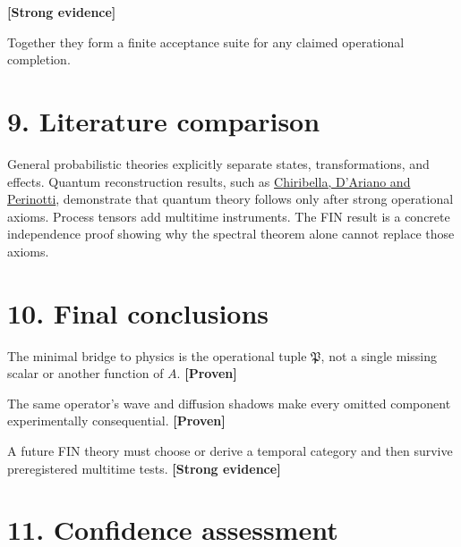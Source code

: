 \documentclass[11pt,a4paper,openany]{report}
\newcommand{\statusProven}{\textcolor{fingreen}{[Proven]}}
\newcommand{\statusStrong}{\textcolor{finblue}{[Strong evidence]}}
\begin{document}
\textbf{\statusStrong{}}

Together they form a finite acceptance suite for any claimed operational completion.

\section{9. Literature comparison}

General probabilistic theories explicitly separate states, transformations, and effects. Quantum reconstruction results, such as \href{https://arxiv.org/abs/0908.1583}{Chiribella, D'Ariano and Perinotti}, demonstrate that quantum theory follows only after strong operational axioms. Process tensors add multitime instruments. The FIN result is a concrete independence proof showing why the spectral theorem alone cannot replace those axioms.

\section{10. Final conclusions}

The minimal bridge to physics is the operational tuple \(\mathfrak P\), not a single missing scalar or another function of \(A\). \textbf{\statusProven{}}

The same operator's wave and diffusion shadows make every omitted component experimentally consequential. \textbf{\statusProven{}}

A future FIN theory must choose or derive a temporal category and then survive preregistered multitime tests. \textbf{\statusStrong{}}

\section{11. Confidence assessment}
\end{document}
